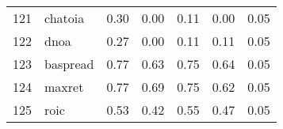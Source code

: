\documentclass[12pt]{article}
\begin{document}
\begin{footnotesize}
\begin{longtable}{rl|c|c|c|c|c}
				121                  & chatoia                     & 0.30                             & 0.00                                                                                          & 0.11                                                                                          & 0.00                                                                                          & 0.05                                                                                                   \\
				122                  & dnoa                        & 0.27                             & 0.00                                                                                          & 0.11                                                                                          & 0.11                                                                                          & 0.05                                                                                                   \\
				123                  & baspread                    & 0.77                             & 0.63                                                                                          & 0.75                                                                                          & 0.64                                                                                          & 0.05                                                                                                   \\
				124                  & maxret                      & 0.77                             & 0.69                                                                                          & 0.75                                                                                          & 0.62                                                                                          & 0.05                                                                                                   \\
				125                  & roic                        & 0.53                             & 0.42                                                                                          & 0.55                                                                                          & 0.47                                                                                          & 0.05                                                                                                   \\

\end{longtable}
\end{footnotesize}
\end{document}
